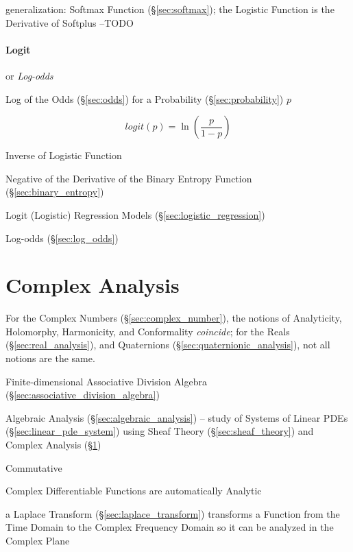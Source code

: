\fist generalization: Softmax Function (\S\ref{sec:softmax}); the Logistic
Function is the Derivative of Softplus --TODO



\paragraph{Logit}\label{sec:logit}\hfill

or \emph{Log-odds}

Log of the Odds (\S\ref{sec:odds}) for a Probability (\S\ref{sec:probability})
$p$

\[
  logit(p) = \ln (\frac{p}{1-p})
\]

Inverse of Logistic Function

Negative of the Derivative of the Binary Entropy Function
(\S\ref{sec:binary_entropy})

Logit (Logistic) Regression Models (\S\ref{sec:logistic_regression})

Log-odds (\S\ref{sec:log_odds})



\section{Complex Analysis}\label{sec:complex_analysis}

For the Complex Numbers (\S\ref{sec:complex_number}), the notions of
Analyticity, Holomorphy, Harmonicity, and Conformality \emph{coincide}; for the
Reals (\S\ref{sec:real_analysis}), and Quaternions
(\S\ref{sec:quaternionic_analysis}), not all notions are the same.

Finite-dimensional Associative Division Algebra
(\S\ref{sec:associative_division_algebra})

\fist Algebraic Analysis (\S\ref{sec:algebraic_analysis}) -- study of Systems of
Linear PDEs (\S\ref{sec:linear_pde_system}) using Sheaf Theory
(\S\ref{sec:sheaf_theory}) and Complex Analysis (\S\ref{sec:complex_analysis})

Commutative

Complex Differentiable Functions are automatically Analytic %

a Laplace Transform (\S\ref{sec:laplace_transform}) transforms a Function from
the Time Domain to the Complex Frequency Domain so it can be analyzed in the
Complex Plane

